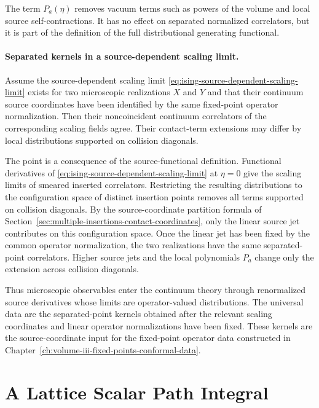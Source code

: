 The term \(P_a(\eta)\) removes vacuum terms such as powers of the volume and
local source self-contractions.  It has no effect on separated normalized
correlators, but it is part of the definition of the full distributional
generating functional.

\paragraph{Separated kernels in a source-dependent scaling limit.}
Assume the source-dependent scaling limit
\eqref{eq:ising-source-dependent-scaling-limit} exists for two microscopic
realizations \(X\) and \(Y\) and that their continuum source coordinates have
been identified by the same fixed-point operator normalization.  Then their
noncoincident continuum correlators of the corresponding scaling fields agree.
Their contact-term extensions may differ by local distributions supported on
collision diagonals.

The point is a consequence of the source-functional definition.  Functional
derivatives of
\eqref{eq:ising-source-dependent-scaling-limit} at \(\eta=0\) give the
scaling limits of smeared inserted correlators.  Restricting the resulting
distributions to the configuration space of distinct insertion points removes
all terms supported on collision diagonals.  By the source-coordinate
partition formula of
Section~\ref{sec:multiple-insertions-contact-coordinates}, only the linear
source jet contributes on this configuration space.  Once the linear jet has
been fixed by the common operator normalization, the two realizations have the
same separated-point correlators.  Higher source jets and the local
polynomials \(P_a\) change only the extension across collision diagonals.

Thus microscopic observables enter the continuum theory through renormalized
source derivatives whose limits are operator-valued distributions.  The
universal data are the separated-point kernels obtained after the relevant
scaling coordinates and linear operator normalizations have been fixed.  These
kernels are the source-coordinate input for the fixed-point operator data
constructed in Chapter~\ref{ch:volume-iii-fixed-points-conformal-data}.

\section{A Lattice Scalar Path Integral}

